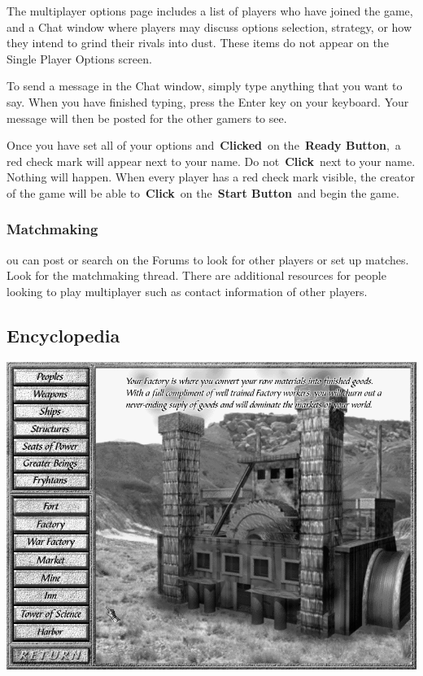 The multiplayer options page includes a list of players who have joined the game, and a Chat window where players may discuss options selection, strategy, or how they intend to grind their rivals into dust. These items do not appear on the Single Player Options screen.

To send a message in the Chat window, simply type anything that you want to say. When you have finished typing, press the Enter key on your keyboard. Your message will then be posted for the other gamers to see.

Once you have set all of your options and \textbf{Clicked} on the \textbf{Ready Button}, a red check mark will appear next to your name. Do not \textbf{Click} next to your name. Nothing will happen. When every player has a red check mark visible, the creator of the game will be able to \textbf{Click} on the \textbf{Start Button} and begin the game.

\subsubsection{Matchmaking}

ou can post or search on the Forums to look for other players or set up matches. Look for the matchmaking thread. There are additional resources for people looking to play multiplayer such as contact information of other players.

\subsection{Encyclopedia}


\begin{center}
	\includegraphics[width=0.7\linewidth]{Iencyclopedia}
\end{center}


